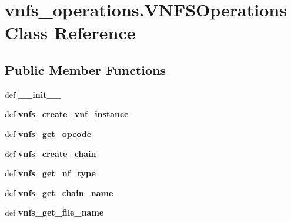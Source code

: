 \hypertarget{classvnfs__operations_1_1VNFSOperations}{\section{vnfs\-\_\-operations.\-V\-N\-F\-S\-Operations Class Reference}
\label{classvnfs__operations_1_1VNFSOperations}
}
\subsection*{Public Member Functions}
\begin{DoxyCompactItemize}
\item 
\hypertarget{classvnfs__operations_1_1VNFSOperations_a8aeb0c031c7f7b97e8544ed7d8c49b35}{def {\bfseries \-\_\-\-\_\-init\-\_\-\-\_\-}}\label{classvnfs__operations_1_1VNFSOperations_a8aeb0c031c7f7b97e8544ed7d8c49b35}

\item 
\hypertarget{classvnfs__operations_1_1VNFSOperations_ae73c421b301cbda862896f9fe67a7941}{def {\bfseries vnfs\-\_\-create\-\_\-vnf\-\_\-instance}}\label{classvnfs__operations_1_1VNFSOperations_ae73c421b301cbda862896f9fe67a7941}

\item 
\hypertarget{classvnfs__operations_1_1VNFSOperations_a3c0b706c40d09a2ed679aed33d37b5e9}{def {\bfseries vnfs\-\_\-get\-\_\-opcode}}\label{classvnfs__operations_1_1VNFSOperations_a3c0b706c40d09a2ed679aed33d37b5e9}

\item 
\hypertarget{classvnfs__operations_1_1VNFSOperations_ab0c04fabd997ea1c33dfa2e7da194ad0}{def {\bfseries vnfs\-\_\-create\-\_\-chain}}\label{classvnfs__operations_1_1VNFSOperations_ab0c04fabd997ea1c33dfa2e7da194ad0}

\item 
\hypertarget{classvnfs__operations_1_1VNFSOperations_a75430767bdb54f256059c588058b3323}{def {\bfseries vnfs\-\_\-get\-\_\-nf\-\_\-type}}\label{classvnfs__operations_1_1VNFSOperations_a75430767bdb54f256059c588058b3323}

\item 
\hypertarget{classvnfs__operations_1_1VNFSOperations_ada474b1f4ed43caba4718638143870cc}{def {\bfseries vnfs\-\_\-get\-\_\-chain\-\_\-name}}\label{classvnfs__operations_1_1VNFSOperations_ada474b1f4ed43caba4718638143870cc}

\item 
\hypertarget{classvnfs__operations_1_1VNFSOperations_a9461289b4af0fef0db381e5ec17a6cac}{def {\bfseries vnfs\-\_\-get\-\_\-file\-\_\-name}}\label{classvnfs__operations_1_1VNFSOperations_a9461289b4af0fef0db381e5ec17a6cac}


\end{DoxyCompactItemize}
